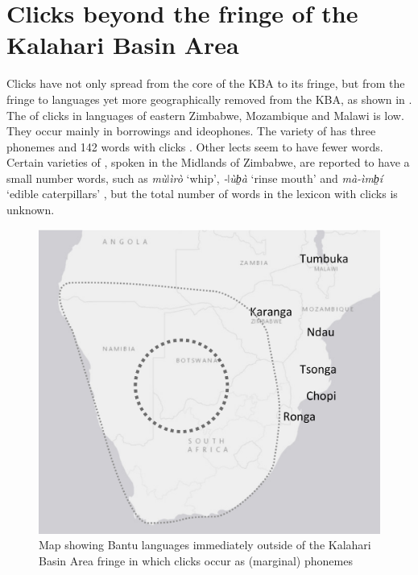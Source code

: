 \documentclass[output=paper
,newtxmath
,modfonts
,nonflat]{langsci/langscibook}
\begin{document}
\section{Clicks beyond the fringe of the Kalahari Basin Area}\label{sec:sands:4}

Clicks have not only spread from the core of the KBA to its fringe, but from the fringe to languages yet more geographically removed from the KBA, as shown in . The  of clicks in  languages of eastern Zimbabwe, Mozambique and Malawi is low. They occur mainly in borrowings and ideophones. The  variety of  has three  phonemes and 142 words with clicks \citep{Sitoe1996}. Other lects seem to have fewer  words. Certain varieties of , spoken in the Midlands of Zimbabwe, are reported to have a small number  words, such as \textit{mùǀìrò} ‘whip’, \textit{-ǀùb̤à} ‘rinse mouth’ and \textit{mà-{\textbar}ìmb̤í} ‘edible caterpillars’ \citep{Pongweni1990}, but the total number of words in the lexicon with clicks is unknown. 

\begin{figure}
\includegraphics[width=\textwidth]{figures/sands-fig4.png}
\caption{Map showing Bantu languages immediately outside of the Kalahari Basin Area fringe in which clicks occur as (marginal) phonemes}
\label{fig:sands:4}
\end{figure}
\end{document}
